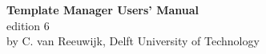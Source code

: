 \begin{titlepage}
\begin{center}
{\Huge \bf Template Manager Users' Manual} \\
\vspace{2mm}
{\Large edition 6} \\
\vspace{5mm}
{\Large by C. van Reeuwijk, Delft University of Technology}
\vspace{2cm}
\begin{center}

\end{center}
\end{center}
\end{titlepage}
